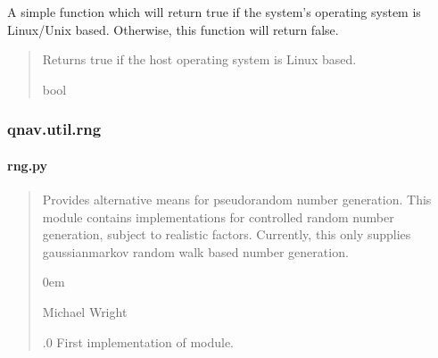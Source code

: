 \documentclass[letterpaper,10pt,english]{sphinxmanual}
\begin{document}
\begin{fulllineitems}
\label{\detokenize{modules/util/system:qnav.util.system.is_linux_platform}}
\pysigstartsignatures
{}
\pysigstopsignatures
\sphinxAtStartPar
A simple function which will return true if the system’s operating system
is Linux/Unix based. Otherwise, this function will return false.
\begin{quote}\begin{description}
\sphinxAtStartPar
Returns true if the host operating system is Linux based.

\sphinxAtStartPar
bool

\end{description}\end{quote}

\end{fulllineitems}


\sphinxstepscope


\subsubsection{qnav.util.rng}
\label{\detokenize{modules/util/rng:module-qnav.util.rng}}\label{\detokenize{modules/util/rng:qnav-util-rng}}\label{\detokenize{modules/util/rng::doc}}

\paragraph{rng.py}
\label{\detokenize{modules/util/rng:rng-py}}\begin{quote}\begin{description}
\sphinxAtStartPar
Provides alternative means for pseudo\sphinxhyphen{}random number generation.
This module contains implementations for controlled random number
generation, subject to realistic factors. Currently, this only
supplies gaussian\sphinxhyphen{}markov random walk based number generation.

\begin{DUlineblock}{0em}
\item[] Michael Wright \sphinxhyphen{} 
\end{DUlineblock}

.0 \sphinxhyphen{} First implementation of module.

\end{description}\end{quote}
\end{document}

